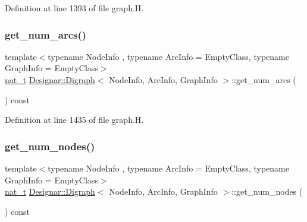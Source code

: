 Definition at line 1393 of file graph.\+H.

\mbox{\label{class_designar_1_1_digraph_aa6289acc079b48c3ebaead44a974d716}} 
\subsubsection{\texorpdfstring{get\+\_\+num\+\_\+arcs()}{get\_num\_arcs()}}
{\footnotesize\ttfamily template$<$typename Node\+Info , typename Arc\+Info  = Empty\+Class, typename Graph\+Info  = Empty\+Class$>$ \\
\hyperlink{namespace_designar_aa72662848b9f4815e7bf31a7cf3e33d1}{nat\+\_\+t} \hyperlink{class_designar_1_1_digraph}{Designar\+::\+Digraph}$<$ Node\+Info, Arc\+Info, Graph\+Info $>$\+::get\+\_\+num\+\_\+arcs (\begin{DoxyParamCaption}{ }\end{DoxyParamCaption}) const\hspace{0.3cm}{\ttfamily [inline]}}



Definition at line 1435 of file graph.\+H.

\mbox{\label{class_designar_1_1_digraph_a7e2f0b56ec85cfd63ff757bef58ae702}} 
\subsubsection{\texorpdfstring{get\+\_\+num\+\_\+nodes()}{get\_num\_nodes()}}
{\footnotesize\ttfamily template$<$typename Node\+Info , typename Arc\+Info  = Empty\+Class, typename Graph\+Info  = Empty\+Class$>$ \\
\hyperlink{namespace_designar_aa72662848b9f4815e7bf31a7cf3e33d1}{nat\+\_\+t} \hyperlink{class_designar_1_1_digraph}{Designar\+::\+Digraph}$<$ Node\+Info, Arc\+Info, Graph\+Info $>$\+::get\+\_\+num\+\_\+nodes (\begin{DoxyParamCaption}{ }\end{DoxyParamCaption}) const\hspace{0.3cm}{\ttfamily [inline]}}



